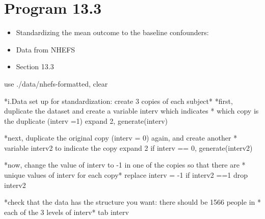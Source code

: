 \documentclass[
  10pt,
  a4paper,
]{book}
\newenvironment{Shaded}{\begin{snugshade}}{\end{snugshade}}
\newcommand{\KeywordTok}[1]{\textcolor[rgb]{0.00,0.46,0.62}{#1}}
\newcommand{\NormalTok}[1]{\textcolor[rgb]{0.00,0.46,0.62}{#1}}
\newcommand{\OtherTok}[1]{\textcolor[rgb]{0.00,0.46,0.62}{#1}}
\providecommand{\tightlist}{%
  \setlength{\itemsep}{0pt}\setlength{\parskip}{0pt}}
\begin{document}
\hypertarget{program-13.3-1}{%
\section{Program 13.3}\label{program-13.3-1}}

\begin{itemize}
\tightlist
\item
  Standardizing the mean outcome to the baseline confounders:
\item
  Data from NHEFS
\item
  Section 13.3
\end{itemize}

\begin{Shaded}
\begin{Highlighting}[]
\KeywordTok{use}\NormalTok{ ./}\KeywordTok{data}\NormalTok{/nhefs{-}formatted, }\KeywordTok{clear}

\NormalTok{*i.Data }\KeywordTok{set}\NormalTok{ up }\KeywordTok{for}\NormalTok{ standardization: create 3 copies }\KeywordTok{of}\NormalTok{ each subject*}
\NormalTok{*first, duplicate the dataset and create a }\KeywordTok{variable}\NormalTok{ \textquotesingle{}interv\textquotesingle{} which indicates}
\NormalTok{* which copy is the duplicate (interv =1)}
\NormalTok{expand 2, }\KeywordTok{generate}\NormalTok{(interv)}

\NormalTok{*next, duplicate the original copy (interv = 0) again, and create another}
\NormalTok{* }\KeywordTok{variable}\NormalTok{ \textquotesingle{}interv2\textquotesingle{} to indicate the copy}
\NormalTok{expand 2 }\KeywordTok{if}\NormalTok{ interv == 0, }\KeywordTok{generate}\NormalTok{(interv2)}

\NormalTok{*now, change the }\OtherTok{value} \KeywordTok{of}\NormalTok{ \textquotesingle{}interv\textquotesingle{} to {-}1 }\KeywordTok{in}\NormalTok{ one }\KeywordTok{of}\NormalTok{ the copies so that there are}
\NormalTok{* }\KeywordTok{unique} \KeywordTok{values} \KeywordTok{of}\NormalTok{ interv }\KeywordTok{for}\NormalTok{ each copy*}
\KeywordTok{replace}\NormalTok{ interv = {-}1  }\KeywordTok{if}\NormalTok{ interv2 ==1}
\KeywordTok{drop}\NormalTok{ interv2 }

\NormalTok{*check that the }\KeywordTok{data}\NormalTok{ has the structure you want: there should }\KeywordTok{be}\NormalTok{ 1566 people }\KeywordTok{in}
\NormalTok{* each }\KeywordTok{of}\NormalTok{ the 3 }\KeywordTok{levels} \KeywordTok{of}\NormalTok{ interv*}
\KeywordTok{tab}\NormalTok{ interv}


\end{Highlighting}
\end{Shaded}
\end{document}
